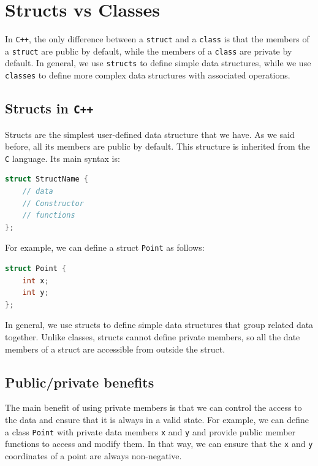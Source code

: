 \section{Structs vs Classes}

In \texttt{C++}, the only difference between a \texttt{struct} and a \texttt{class}
is that the members of a \texttt{struct} are public by default, while the members
of a \texttt{class} are private by default. In general, we use \texttt{structs}
to define simple data structures, while we use \texttt{classes} to define more
complex data structures with associated operations.

\subsection{Structs in \texttt{C++}}

Structs are the simplest user-defined data structure that we have. As we said before, all its
members are public by default. This structure is inherited from the \texttt{C} language.
Its main syntax is:

\begin{lstlisting}[language=C++]
struct StructName {
    // data
    // Constructor
    // functions
};
\end{lstlisting}

For example, we can define a struct \texttt{Point} as follows:

\begin{lstlisting}[language=C++]
struct Point {
    int x;
    int y;
};
\end{lstlisting}

In general, we use structs to define simple data structures that group related
data together. Unlike classes, structs cannot define private members, so all
the date members of a struct are accessible from outside the struct.

\subsection{Public/private benefits}

The main benefit of using private members is that we can control the access to
the data and ensure that it is always in a valid state. For example, we can
define a class \texttt{Point} with private data members \texttt{x} and \texttt{y}
and provide public member functions to access and modify them. In that way, we
can ensure that the \texttt{x} and \texttt{y} coordinates of a point are always
non-negative.\\

